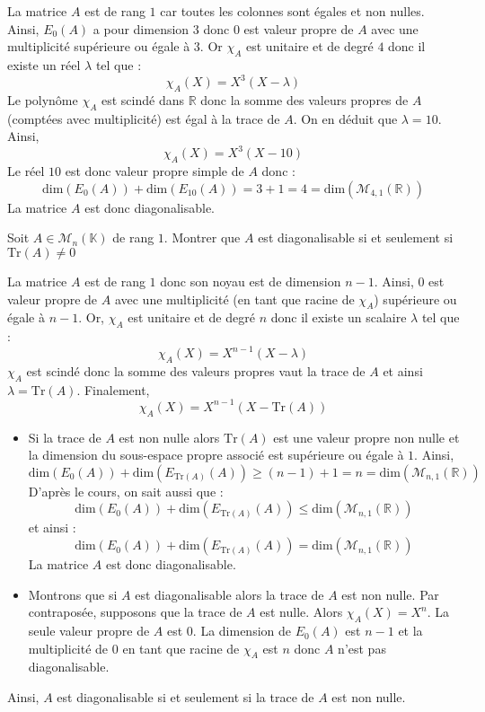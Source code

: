 \documentclass[a4paper,10pt]{report}
\begin{document}
\corr La matrice $A$ est de rang $1$ car toutes les colonnes sont égales et non nulles. Ainsi, $E_0(A)$ a pour dimension $3$ donc $0$ est valeur propre de $A$ avec une multiplicité supérieure ou égale à $3$. Or $\chi_A$ est unitaire et de degré $4$ donc il existe un réel $\lambda$ tel que :
$$ \chi_A(X) = X^3(X-\lambda)$$
Le polynôme $\chi_A$ est scindé dans $\mathbb{R}$ donc la somme des valeurs propres de $A$ (comptées avec multiplicité) est égal à la trace de $A$. On en déduit que $\lambda = 10$. Ainsi,
$$ \chi_A(X)=X^3(X- 10)$$
Le réel $10$ est donc valeur propre simple de $A$ donc :
$$ \textrm{dim}(E_0(A))+ \textrm{dim}(E_{10}(A)) = 3+1 = 4 = \textrm{dim}(\mathcal{M}_{4,1}(\mathbb{R}))$$
La matrice $A$ est donc diagonalisable.

\begin{Exa}\label{Rang} Soit $A \in \mathcal{M}_{n}(\mathbb{K})$ de rang $1$. Montrer que $A$ est diagonalisable si et seulement si $\textrm{Tr}(A) \neq 0$ \end{Exa}

\corr La matrice $A$ est de rang $1$ donc son noyau est de dimension $n-1$. Ainsi, $0$ est valeur propre de $A$ avec une multiplicité (en tant que racine de $\chi_A$) supérieure ou égale à $n-1$. Or, $\chi_A$ est unitaire et de degré $n$ donc il existe un scalaire $\lambda$ tel que :
$$ \chi_A(X)=X^{n-1}(X- \lambda)$$
$\chi_A$ est scindé donc la somme des valeurs propres vaut la trace de $A$ et ainsi $\lambda = \textrm{Tr}(A)$. Finalement,
$$ \chi_A(X)= X^{n-1}(X- \textrm{Tr}(A))$$
\begin{itemize}
\item Si la trace de $A$ est non nulle alors $\textrm{Tr}(A)$ est une valeur propre non nulle et la dimension du sous-espace propre associé est supérieure ou égale à $1$. Ainsi,
$$ \textrm{dim}(E_0(A))+ \textrm{dim}(E_{\textrm{Tr}(A)}(A)) \geq (n-1)+1 = n = \textrm{dim}(\mathcal{M}_{n,1}(\mathbb{R}))$$
D'après le cours, on sait aussi que :
$$ \textrm{dim}(E_0(A))+ \textrm{dim}(E_{\textrm{Tr}(A)}(A)) \leq \textrm{dim}(\mathcal{M}_{n,1}(\mathbb{R}))$$
et ainsi :
$$ \textrm{dim}(E_0(A))+ \textrm{dim}(E_{\textrm{Tr}(A)}(A)) = \textrm{dim}(\mathcal{M}_{n,1}(\mathbb{R}))$$
La matrice $A$ est donc diagonalisable.
\item Montrons que si $A$ est diagonalisable alors la trace de $A$ est non nulle. Par contraposée, supposons que la trace de $A$ est nulle. Alors $\chi_A(X)=X^n$. La seule valeur propre de $A$ est $0$. La dimension de $E_0(A)$ est $n-1$ et la multiplicité de $0$ en tant que racine de $\chi_A$ est $n$ donc $A$ n'est pas diagonalisable.
\end{itemize}
Ainsi, $A$ est diagonalisable si et seulement si la trace de $A$ est non nulle.
\end{document}
